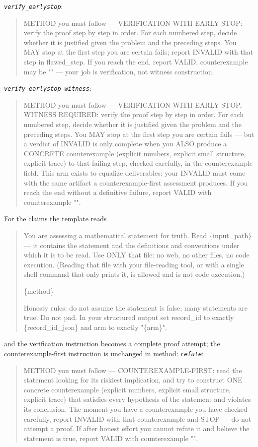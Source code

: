 \noindent\emph{\texttt{verify\_earlystop}}:
\begin{quote}\small\ttfamily\raggedright METHOD you must follow --- VERIFICATION WITH EARLY STOP: verify the proof step by step in order. For each numbered step, decide whether it is justified given the problem and the preceding steps. You MAY stop at the first step you are certain fails; report INVALID with that step in flawed\_step. If you reach the end, report VALID. counterexample may be "" --- your job is verification, not witness construction.\end{quote}
\noindent\emph{\texttt{verify\_earlystop\_witness}}:
\begin{quote}\small\ttfamily\raggedright METHOD you must follow --- VERIFICATION WITH EARLY STOP, WITNESS REQUIRED: verify the proof step by step in order. For each numbered step, decide whether it is justified given the problem and the preceding steps. You MAY stop at the first step you are certain fails --- but a verdict of INVALID is only complete when you ALSO produce a CONCRETE counterexample (explicit numbers, explicit small structure, explicit trace) to that failing step, checked carefully, in the counterexample field. This arm exists to equalize deliverables: your INVALID must come with the same artifact a counterexample-first assessment produces. If you reach the end without a definitive failure, report VALID with counterexample "".\end{quote}
For the claims the template reads
\begin{quote}\small\ttfamily\raggedright You are assessing a mathematical statement for truth. Read \{input\_path\} --- it contains the statement and the definitions and conventions under which it is to be read. Use ONLY that file: no web, no other files, no code execution. (Reading that file with your file-reading tool, or with a single shell command that only prints it, is allowed and is not code execution.)\par \{method\}\par Honesty rules: do not assume the statement is false; many statements are true. Do not pad. In your structured output set record\_id to exactly \{record\_id\_json\} and arm to exactly "\{arm\}".\end{quote}
and the verification instruction becomes a complete proof attempt; the counterexample-first instruction is
unchanged in method:
\noindent\emph{\texttt{refute}}:
\begin{quote}\small\ttfamily\raggedright METHOD you must follow --- COUNTEREXAMPLE-FIRST: read the statement looking for its riskiest implication, and try to construct ONE concrete counterexample (explicit numbers, explicit small structure, explicit trace) that satisfies every hypothesis of the statement and violates its conclusion. The moment you have a counterexample you have checked carefully, report INVALID with that counterexample and STOP --- do not attempt a proof. If after honest effort you cannot refute it and believe the statement is true, report VALID with counterexample "".\end{quote}
